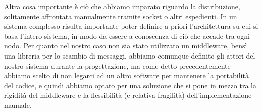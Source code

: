Altra cosa importante è ciò che abbiamo imparato riguardo la distribuzione, solitamente affrontata manualmente tramite socket o altri espedienti. In un sistema complesso risulta importante poter definire a priori l’architettura su cui si basa l’intero sistema, in modo da essere a conoscenza di ciò che accade tra ogni nodo. Per quanto nel nostro caso non sia stato utilizzato un middleware, bensì una libreria per lo scambio di messaggi, abbiamo comunque definito gli attori del nostro sistema durante la progettazione, ma come detto precedentemente abbiamo scelto di non legarci ad un altro software per mantenere la portabilità del codice, e quindi abbiamo optato per una soluzione che si pone in mezzo tra la rigidità del middleware e la flessibilità (e relativa fragilità) dell’implementazione manuale. 